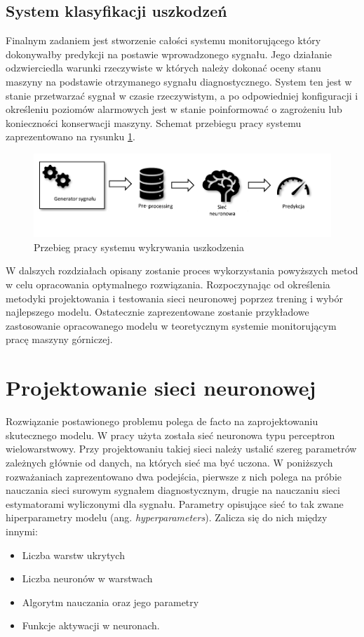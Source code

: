 \documentclass[inzynierska]{pwr_wmat_praca_dyplomowa}
\theoremstyle{plain}
\numberwithin{theorem}{chapter}
\theoremstyle{definition}
\numberwithin{theorem}{chapter}
\begin{document}
\section{System klasyfikacji uszkodzeń}
Finalnym zadaniem jest stworzenie całości systemu monitorującego który dokonywałby predykcji na postawie wprowadzonego sygnału. Jego działanie odzwierciedla warunki rzeczywiste w których należy dokonać oceny stanu maszyny na podstawie otrzymanego sygnału diagnostycznego. System ten jest w stanie przetwarzać sygnał w czasie rzeczywistym, a po odpowiedniej konfiguracji i określeniu poziomów alarmowych jest w stanie poinformować o zagrożeniu lub konieczności konserwacji maszyny. Schemat przebiegu pracy systemu zaprezentowano na rysunku \ref{proces-koncowy}.
\begin{figure}[H]
	\centering
	\includegraphics[scale=0.7]{images/workflow_c.pdf}
	\caption{Przebieg pracy systemu wykrywania uszkodzenia}
	\label{proces-koncowy}
\end{figure}

W dalszych rozdziałach opisany zostanie proces wykorzystania powyższych metod w celu opracowania optymalnego rozwiązania. Rozpoczynając od określenia metodyki projektowania i testowania sieci neuronowej poprzez trening i wybór najlepszego modelu. Ostatecznie zaprezentowane zostanie przykładowe zastosowanie opracowanego modelu w teoretycznym systemie monitorującym pracę maszyny górniczej. 

\chapter{Projektowanie sieci neuronowej}
Rozwiązanie postawionego problemu polega de facto na zaprojektowaniu skutecznego modelu. W pracy użyta została sieć neuronowa typu perceptron wielowarstwowy. Przy projektowaniu takiej sieci należy ustalić szereg parametrów zależnych głównie od danych, na których sieć ma być uczona. W poniższych rozważaniach zaprezentowano dwa podejścia, pierwsze z nich polega na próbie nauczania sieci surowym sygnałem diagnostycznym, drugie na nauczaniu sieci estymatorami wyliczonymi dla sygnału. 
Parametry opisujące sieć to tak zwane hiperparametry modelu (ang. \textit{hyperparameters}). Zalicza się do nich między innymi:
\begin{itemize}
	\item Liczba warstw ukrytych
	\item Liczba neuronów w warstwach
	\item Algorytm nauczania oraz jego parametry
	\item Funkcje aktywacji w neuronach.
\end{itemize}
\end{document}
